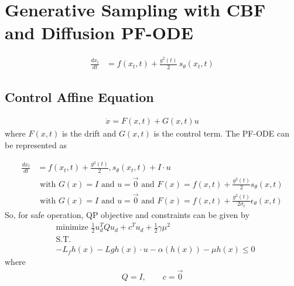 \documentclass{article}
\begin{document}


\section{Generative Sampling with CBF and Diffusion PF-ODE}

\begin{align}
\frac{dx_t}{dt}
&= f(x_t,t) + \frac{g^2(t)}{2}\, s_\theta(x_t,t)
\end{align}

\subsection{Control Affine Equation}

\begin{align}
\dot{x} = F(x,t) + G(x,t)u
\end{align}
where $F(x,t)$ is the drift and $G(x,t)$ is the control term.
The PF-ODE can be represented as 

\begin{align}
\frac{dx_t}{dt}
&= f(x_t,t) + \frac{g^2(t)}{2}, s_\theta(x_t,t) + I\cdot u
\\
&\text{ with }G(x) = I \text{ and } u=\vec{0} \text{ and } F(x)
= f(x,t) + \frac{g^2(t)}{2} s_\theta(x,t)\\
&\text{ with }G(x) = I \text{ and } u=\vec{0} \text{ and } F(x)
= f(x,t) + \frac{g^2(t)}{2\sigma_t} \epsilon_\theta(x,t)
\end{align}
So, for safe operation, QP objective and constraints can be given by 
\begin{align}
    &\text{minimize } \frac{1}{2}u_d^TQu_d + c^Tu_d + \frac{1}{2}\gamma\mu^2
    \\&\text{S.T. }
    \\&-L_fh(x) -Lgh(x)\cdot u -\alpha(h(x)) -\mu h(x)\le 0
\end{align}
where
\begin{align}
Q = I, \qquad c = \vec{0}
\end{align}
\end{document}
